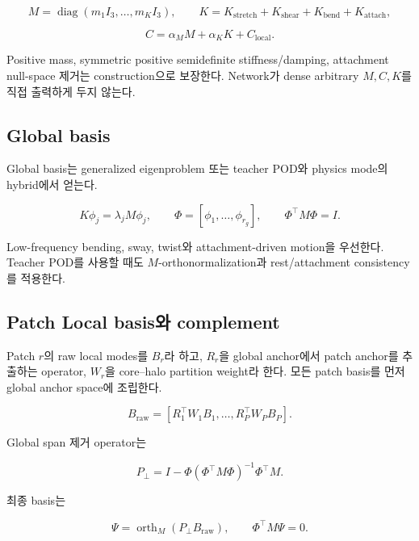 \documentclass[11pt,a4paper]{article}
\newcommand{\diag}{\operatorname{diag}}
\newcommand{\orth}{\operatorname{orth}}
\begin{document}
\begin{equation}
  M=\diag(m_1I_3,\ldots,m_KI_3),\qquad
  K=K_{\mathrm{stretch}}+K_{\mathrm{shear}}+K_{\mathrm{bend}}+K_{\mathrm{attach}},
\end{equation}

\begin{equation}
  C=\alpha_M M+\alpha_K K+C_{\mathrm{local}}.
\end{equation}

Positive mass, symmetric positive semidefinite stiffness/damping,
attachment null-space 제거는 construction으로 보장한다.
Network가 dense arbitrary \(M,C,K\)를 직접 출력하게 두지 않는다.

\subsection{Global basis}

Global basis는 generalized eigenproblem 또는 teacher POD와 physics mode의 hybrid에서 얻는다.

\begin{equation}
  K\phi_j=\lambda_jM\phi_j,
  \qquad
  \Phi=[\phi_1,\ldots,\phi_{r_g}],
  \qquad
  \Phi^\top M\Phi=I.
\end{equation}

Low-frequency bending, sway, twist와 attachment-driven motion을 우선한다.
Teacher POD를 사용할 때도 \(M\)-orthonormalization과 rest/attachment consistency를 적용한다.

\subsection{Patch Local basis와 complement}

Patch \(r\)의 raw local modes를 \(B_r\)라 하고,
\(R_r\)을 global anchor에서 patch anchor를 추출하는 operator,
\(W_r\)을 core--halo partition weight라 한다.
모든 patch basis를 먼저 global anchor space에 조립한다.

\begin{equation}
  B_{\mathrm{raw}}
  =
  [R_1^\top W_1B_1,\ldots,R_P^\top W_PB_P].
\end{equation}

Global span 제거 operator는

\begin{equation}
  P_\perp
  =
  I-\Phi(\Phi^\top M\Phi)^{-1}\Phi^\top M.
\end{equation}

최종 basis는

\begin{equation}
  \Psi=\orth_M(P_\perp B_{\mathrm{raw}}),
  \qquad
  \Phi^\top M\Psi=0.
\end{equation}
\end{document}
